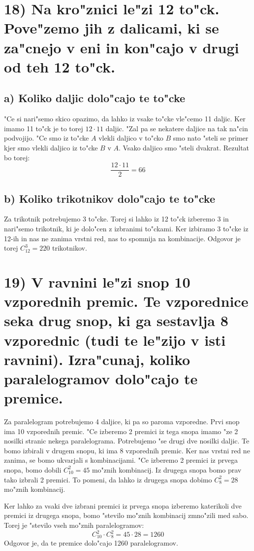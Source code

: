 \documentclass[a4paper, 12pt]{article}
\begin{document}
\section{18) Na kro"znici le"zi 12 to"ck. Pove"zemo jih z dalicami, ki se za"cnejo v eni in kon"cajo v drugi od teh 12 to"ck.}
\subsection*{a) Koliko daljic dolo"cajo te to"cke}
"Ce si nari"semo skico opazimo, da lahko iz vsake to"cke vle"cemo 11 daljic. Ker imamo 11 to"ck je to torej $12 \cdot 11$ daljic. "Zal pa se nekatere daljice na tak na"cin podvojijo. "Ce smo iz to"cke $A$ vlekli daljico v to"cko $B$ smo nato "steli se primer kjer smo vlekli daljico iz to"cke $B$ v $A$. Vsako daljico smo "steli dvakrat. Rezultat bo torej:
\begin{equation*}
\dfrac{12 \cdot 11}{2} = 66
\end{equation*}

\subsection*{b) Koliko trikotnikov dolo"cajo te to"cke}
Za  trikotnik potrebujemo 3 to"cke. Torej si lahko iz 12 to"ck izberemo 3 in nari"semo trikotnik, ki je dolo"cen z izbranimi to"ckami. Ker izbiramo 3 to"cke iz 12-ih in nas ne zanima vrstni red, nas to spomnija na kombinacije. Odgovor je torej $C_{12}^3 = 220$ trikotnikov.

\section*{19) V ravnini le"zi snop 10 vzporednih premic. Te vzporednice seka drug snop, ki ga sestavlja 8 vzporednic (tudi te le"zijo v isti ravnini). Izra"cunaj, koliko paralelogramov dolo"cajo te premice.}
Za paralelogram potrebujemo 4 daljice, ki pa so paroma vzporedne. Prvi snop ima 10 vzporednih premic. "Ce izberemo 2 premici iz tega snopa imamo "ze 2 nosilki stranic nekega paralelograma. Potrebujemo "se drugi dve nosilki daljic. Te bomo izbirali v drugem snopu, ki ima 8 vzporednih premic. Ker nas vrstni red ne zanima, se bomo ukvarjali s kombinacijami. "Ce izberemo 2 premici iz prvega snopa, bomo dobili $C_{10}^2 = 45$ mo"znih kombinacij. Iz drugega snopa bomo prav tako izbrali 2 premici. To pomeni, da lahko iz drugega snopa dobimo $C_8^2 = 28$ mo"znih kombinacij.

Ker lahko za vsaki dve izbrani premici iz prvega snopa izberemo katerikoli dve premici iz drugega snopa, bomo "stevilo mo"znih kombinacij zmno"zili med sabo. Torej je "stevilo vseh mo"znih paralelogramov:
\begin{equation*}
C_{10}^2 \cdot C_8^2 = 45 \cdot 28 = 1260
\end{equation*}
Odgovor je, da te premice dolo"cajo 1260 paralelogramov.
\end{document}
